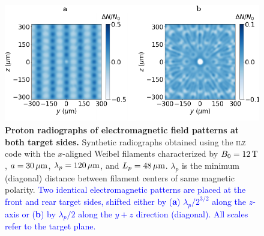 \documentclass[aps,superscriptaddress]{revtex4}
\begin{document}
\begin{figure}[!]
\centerline{
\includegraphics[width=.66\textwidth]{FigS10.pdf} }
\caption{\label{fig:radiosup2}  
\textbf{Proton radiographs of electromagnetic field patterns at both target sides.}
Synthetic radiographs obtained using the \textsc{ilz} code with the $x$-aligned Weibel filaments characterized by $B_0=12\,\rm T$, $a=30\,\rm \mu m$, $\lambda_p=120\,\rm \mu m$, and $L_p=48\,\rm \mu m$. $\lambda_p$ is the minimum (diagonal) distance between filament centers of same magnetic polarity. 
\textcolor{blue}{
Two identical electromagnetic patterns are placed at the front and rear target sides, shifted either by ({\bf a}) $\lambda_p/2^{3/2}$  along the $z$-axis or ({\bf b}) by $\lambda_p/2$  along the $y+z$ direction (diagonal). All scales refer to the target plane. 
}
}
\end{figure}


%
%
\end{document}

